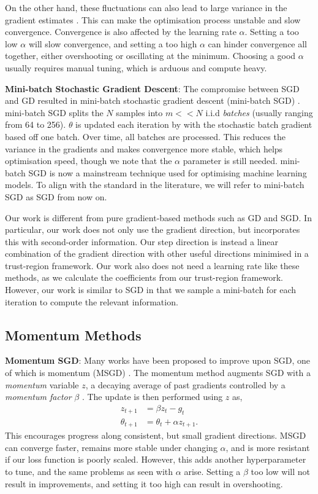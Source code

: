 On the other hand, these fluctuations can also lead to large variance in the gradient estimates \citep{sun2019survey}. This can make the optimisation process unstable and slow convergence. Convergence is also affected by the learning rate $\alpha$. Setting a too low $\alpha$ will slow convergence, and setting a too high $\alpha$ can hinder convergence all together, either overshooting or oscillating at the minimum. Choosing a good $\alpha$ usually requires manual tuning, which is arduous and compute heavy.

\textbf{Mini-batch Stochastic Gradient Descent}: The compromise between SGD and GD resulted in mini-batch stochastic gradient descent (mini-batch SGD) \citep{robbins1951stochastic}. mini-batch SGD splits the $N$ samples into $m << N$ i.i.d \textit{batches} (usually ranging from 64 to 256). $\theta$ is updated each iteration by with the stochastic batch gradient based off one batch. Over time, all batches are processed. This reduces the variance in the gradients and makes convergence more stable, which helps optimisation speed, though we note that the $\alpha$ parameter is still needed. mini-batch SGD is now a mainstream technique used for optimising machine learning models. To align with the standard in the literature, we will refer to mini-batch SGD as SGD from now on.

Our work is different from pure gradient-based methods such as GD and SGD. In particular, our work does not only use the gradient direction, but incorporates this with second-order information. Our step direction is instead a linear combination of the gradient direction with other useful directions minimised in a trust-region framework. Our work also does not need a learning rate like these methods, as we calculate the coefficients from our trust-region framework. However, our work is similar to SGD in that we sample a mini-batch for each iteration to compute the relevant information.

\subsection{Momentum Methods} 
\label{ssec:momentum}

\textbf{Momentum SGD}: Many works have been proposed to improve upon SGD, one of which is momentum (MSGD) \citep{polyak1964some}. The momentum method augments SGD with a \textit{momentum} variable $z$, a decaying average of past gradients controlled by a \textit{momentum factor} $\beta$ \citep{polyak1964some, henriques2019small}. The update is then performed using $z$ as,
\begin{align}
    z_{t+1} &= \beta z_{t} - g_t \\
    \theta_{t+1} &= \theta_t + \alpha z_{t+1}.
\end{align}
This encourages progress along consistent, but small gradient directions. 
MSGD can converge faster, remains more stable under changing $\alpha$, and is more resistant if our loss function is poorly scaled. However, this adds another hyperparameter to tune, and the same problems as seen with $\alpha$ arise. Setting a $\beta$ too low will not result in improvements, and setting it too high can result in overshooting.

